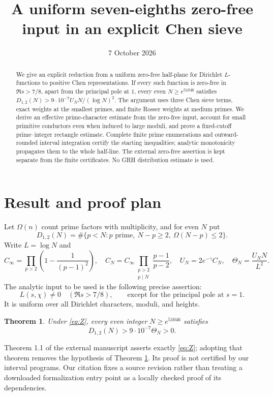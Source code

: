 \documentclass[11pt]{article}
\title{A uniform seven-eighths zero-free input in an explicit Chen sieve}
\author{}
\date{7 October 2026}
\newtheorem{theorem}{Theorem}[section]
\theoremstyle{remark}\newtheorem{remark}[theorem]{Remark}
\newcommand{\Th}{\Theta_N}
\begin{document}
\maketitle
\begin{abstract}
We give an explicit reduction from a uniform zero-free half-plane for
Dirichlet $L$-functions to positive Chen representations. If every such
function is zero-free in $\Re s>7/8$, apart from the principal pole at
$1$, every even $N\ge e^{51046}$ satisfies
$D_{1,2}(N)>9\cdot10^{-7}U_NN/(\log N)^2$.
The argument uses three Chen sieve terms, exact weights at the smallest
primes, and finite Rosser weights at medium primes. We derive an effective
prime-character estimate from the zero-free input, account for small
primitive conductors even when induced to large moduli, and prove a
fixed-cutoff prime--integer rectangle estimate. Complete finite prime
enumerations and outward-rounded interval integration certify the starting
inequalities; analytic monotonicity propagates them to the whole half-line.
The external zero-free assertion is kept separate from the finite
certificates. No GRH distribution estimate is used.
\end{abstract}
\tableofcontents

\section{Result and proof plan}
Let $\Omega(n)$ count prime factors with multiplicity, and for even $N$ put
\[
D_{1,2}(N)=\#\{p<N:p\text{ prime},\ N-p\ge2,\ \Omega(N-p)\le2\}.
\]
Write $L=\log N$ and
\[
C_\infty=\prod_{p>2}\left(1-\frac1{(p-1)^2}\right),\quad
C_N=C_\infty\prod_{\substack{p>2\\p\mid N}}\frac{p-1}{p-2},\quad
U_N=2e^{-\gamma}C_N,\quad \Th=\frac{U_NN}{L^2}.
\]
The analytic input to be used is the following precise assertion:
\begin{equation}\label{eq:Z}
L(s,\chi)\ne0\quad(\Re s>7/8),
\qquad\text{except for the principal pole at }s=1.\tag{Z}
\end{equation}
It is uniform over all Dirichlet characters, moduli, and heights.
\begin{theorem}\label{thm:main}
Under \eqref{eq:Z}, every even integer $N\ge e^{51046}$ satisfies
\[
D_{1,2}(N)>9\cdot10^{-7}\Th>0.
\]
\end{theorem}
Theorem 1.1 of the external manuscript \cite{QRH} asserts exactly
\eqref{eq:Z}; adopting that theorem removes the hypothesis of
Theorem \ref{thm:main}. Its proof is not certified by our interval programs.
Our citation fixes a source revision rather than treating a downloaded
formalization entry point as a locally checked proof of its dependencies.
\end{document}
